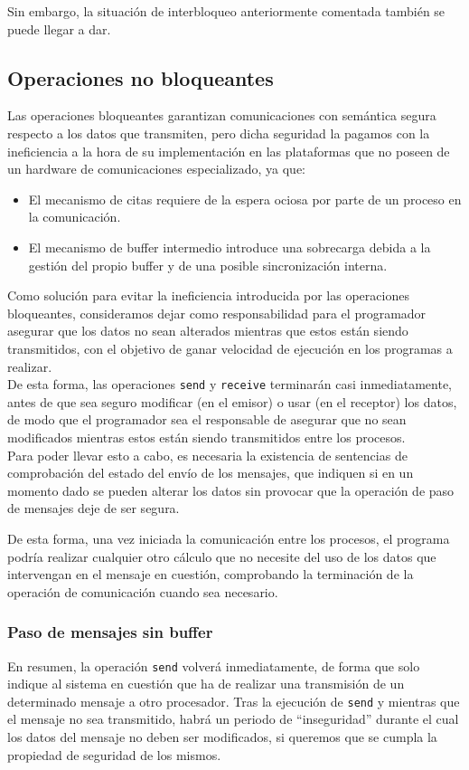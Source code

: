 Sin embargo, la situación de interbloqueo anteriormente comentada también se puede llegar a dar.

\subsection{Operaciones no bloqueantes}
Las operaciones bloqueantes garantizan comunicaciones con semántica segura respecto a los datos que transmiten, pero dicha seguridad la pagamos con la ineficiencia a la hora de su implementación en las plataformas que no poseen de un hardware de comunicaciones especializado, ya que:
\begin{itemize}
    \item El mecanismo de citas requiere de la espera ociosa por parte de un proceso en la comunicación.
    \item El mecanismo de buffer intermedio introduce una sobrecarga debida a la gestión del propio buffer y de una posible sincronización interna.
\end{itemize}
Como solución para evitar la ineficiencia introducida por las operaciones bloqueantes, consideramos dejar como responsabilidad para el programador asegurar que los datos no sean alterados mientras que estos están siendo transmitidos, con el objetivo de ganar velocidad de ejecución en los programas a realizar.\\

De esta forma, las operaciones \verb|send| y \verb|receive| terminarán casi inmediatamente, antes de que sea seguro modificar (en el emisor) o usar (en el receptor) los datos, de modo que el programador sea el responsable de asegurar que no sean modificados mientras estos están siendo transmitidos entre los procesos.\\

Para poder llevar esto a cabo, es necesaria la existencia de sentencias de comprobación del estado del envío de los mensajes, que indiquen si en un momento dado se pueden alterar los datos sin provocar que la operación de paso de mensajes deje de ser segura.

De esta forma, una vez iniciada la comunicación entre los procesos, el programa podría realizar cualquier otro cálculo que no necesite del uso de los datos que intervengan en el mensaje en cuestión, comprobando la terminación de la operación de comunicación cuando sea necesario.

\subsubsection{Paso de mensajes sin buffer}
En resumen, la operación \verb|send| volverá inmediatamente, de forma que solo indique al sistema en cuestión que ha de realizar una transmisión de un determinado mensaje a otro procesador. Tras la ejecución de \verb|send| y mientras que el mensaje no sea transmitido, habrá un periodo de ``inseguridad'' durante el cual los datos del mensaje no deben ser modificados, si queremos que se cumpla la propiedad de seguridad de los mismos.\\

